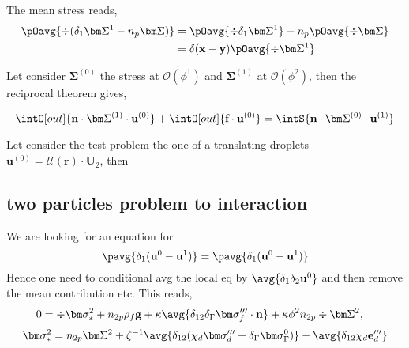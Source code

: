 The mean stress reads,
\begin{align}
    \pOavg{\div (\delta_1 \bm\Sigma^1-n_p \bm\Sigma)}
    &=
    \pOavg{\div \delta_1 \bm\Sigma^1}
    - n_p\pOavg{\div \bm\Sigma}\\
    &=
    \delta(\textbf{x}- \textbf{y})\pOavg{\div \bm\Sigma^1}
\end{align}


Let consider $\bm\Sigma^{(0)}$ the stress at $\mathcal{O}(\phi^1)$ and $\bm\Sigma^{(1)}$ at $\mathcal{O}(\phi^2)$, then the reciprocal theorem gives, 

\begin{equation}
    \intO[out]{\textbf{n}\cdot \bm\Sigma^{(1)} \cdot \textbf{u}^{(0)}}
    + \intO[out]{\textbf{f} \cdot \textbf{u}^{(0)}}
    =
    \intS{\textbf{n}\cdot \bm\Sigma^{(0)} \cdot \textbf{u}^{(1)}}
\end{equation}

Let consider the test problem the one of a translating droplets $\textbf{u}^{(0)}= \mathcal{U}(\textbf{r})\cdot \textbf{U}_2$, then 

\subsection{two particles problem to interaction}
We are looking for an equation for 
\begin{equation}
    \pavg{\delta_1 (\textbf{u}^0  - \textbf{u}^1)}
    =
    \pavg{\delta_1 (\textbf{u}^0  - \textbf{u}^1)}
\end{equation}
Hence one need to conditional avg the local eq by $\avg{\delta_1\delta_2 \textbf{u}^0}$ and then remove the mean contribution etc. 
This reads, 
\begin{align*}
0
   &= 
   \div \bm\sigma_*^2
   +n_{2p} \rho_f \textbf{g}
   +\kappa\avg{\delta_{12}\delta_\Gamma  \bm\sigma_f'''\cdot \textbf{n}}
   +\kappa \phi^2 n_{2p}\div \bm\Sigma^2,
\end{align*}
\begin{equation}
    \bm\sigma_*^2 = 
    n_{2p} \bm\Sigma^2
    + \zeta^{-1}\avg{\delta_{12}(\chi_d \bm\sigma_d''' + \delta_\Gamma \bm\sigma_\Gamma^0)}
    - \avg{\delta_{12} \chi_d \textbf{e}_d'''}
\end{equation}

